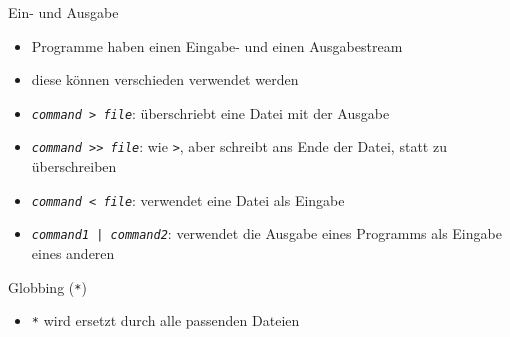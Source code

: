 \begin{frame}{Ein- und Ausgabe}
  \begin{itemize}
    \item Programme haben einen Eingabe- und einen Ausgabestream
    \item diese können verschieden verwendet werden
    \item \texttt{\textit{command} > \textit{file}}: überschriebt eine Datei mit der Ausgabe
    \item \texttt{\textit{command} >> \textit{file}}: wie \texttt{>}, aber schreibt ans Ende der Datei, statt zu überschreiben
    \item \texttt{\textit{command} < \textit{file}}: verwendet eine Datei als Eingabe
    \item \texttt{\textit{command1} | \textit{command2}}: verwendet die Ausgabe eines Programms als Eingabe eines anderen
  \end{itemize}
\end{frame}

\begin{frame}{Globbing (\texttt{*})}
  \begin{itemize}
    \item \texttt{*} wird ersetzt durch alle passenden Dateien
  \end{itemize}
\end{frame}
